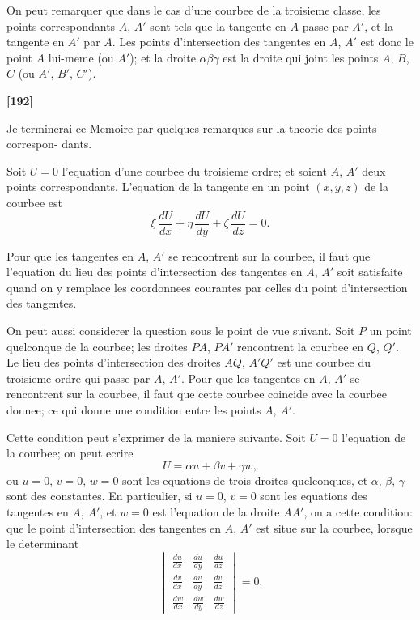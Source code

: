 \documentclass[11pt,a4paper]{article}
\begin{document}
On peut remarquer que dans le cas d'une courbee de la troisieme classe, les points
correspondants $A$, $A'$ sont tels que la tangente en $A$ passe par $A'$, et la tangente en
$A'$ par $A$. Les points d'intersection des tangentes en $A$, $A'$ est donc le point $A$ lui-meme
(ou $A'$); et la droite $\alpha\beta\gamma$ est la droite qui joint les points $A$, $B$, $C$ (ou $A'$, $B'$, $C'$).

\textbf{[192]}

Je terminerai ce Memoire par quelques remarques sur la theorie des points correspon-
dants.

Soit $U = 0$ l'equation d'une courbee du troisieme ordre; et soient $A$, $A'$ deux points
correspondants. L'equation de la tangente en un point $(x, y, z)$ de la courbee est
\[\xi\, \frac{dU}{dx} + \eta\, \frac{dU}{dy} + \zeta\, \frac{dU}{dz} = 0.\]

Pour que les tangentes en $A$, $A'$ se rencontrent sur la courbee, il faut que l'equation
du lieu des points d'intersection des tangentes en $A$, $A'$ soit satisfaite quand on y
remplace les coordonnees courantes par celles du point d'intersection des tangentes.

On peut aussi considerer la question sous le point de vue suivant. Soit $P$ un point
quelconque de la courbee; les droites $PA$, $PA'$ rencontrent la courbee en $Q$, $Q'$. Le lieu
des points d'intersection des droites $AQ$, $A'Q'$ est une courbee du troisieme ordre qui
passe par $A$, $A'$. Pour que les tangentes en $A$, $A'$ se rencontrent sur la courbee, il faut
que cette courbee coincide avec la courbee donnee; ce qui donne une condition entre
les points $A$, $A'$.

Cette condition peut s'exprimer de la maniere suivante. Soit $U = 0$ l'equation de
la courbee; on peut ecrire
\[U = \alpha u + \beta v + \gamma w,\]
ou $u = 0$, $v = 0$, $w = 0$ sont les equations de trois droites quelconques, et $\alpha$, $\beta$, $\gamma$ sont des
constantes. En particulier, si $u = 0$, $v = 0$ sont les equations des tangentes en $A$, $A'$,
et $w = 0$ est l'equation de la droite $AA'$, on a cette condition: que le point d'intersection
des tangentes en $A$, $A'$ est situe sur la courbee, lorsque le determinant
\[\begin{vmatrix}
\frac{du}{dx} & \frac{du}{dy} & \frac{du}{dz}\\
\frac{dv}{dx} & \frac{dv}{dy} & \frac{dv}{dz}\\
\frac{dw}{dx} & \frac{dw}{dy} & \frac{dw}{dz}
\end{vmatrix} = 0.\]
\end{document}
